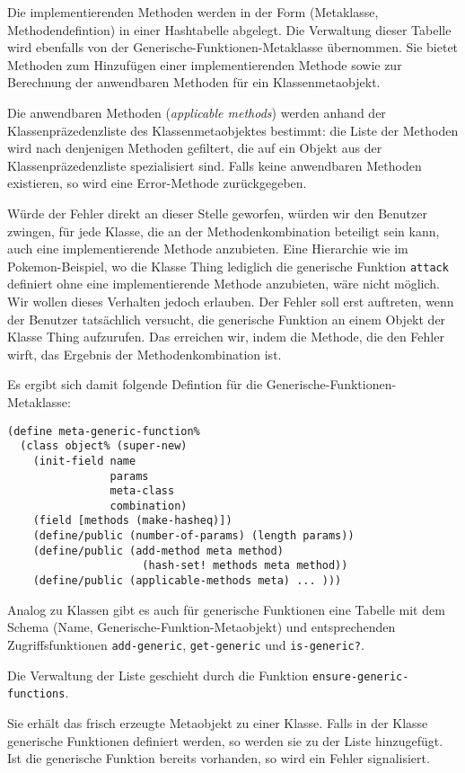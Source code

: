 Die implementierenden Methoden werden in der Form (Metaklasse, Methodendefintion) in einer Hashtabelle abgelegt. Die Verwaltung dieser Tabelle wird ebenfalls von der Generische-Funktionen-Metaklasse übernommen. Sie bietet Methoden zum Hinzufügen einer implementierenden Methode sowie zur Berechnung der anwendbaren Methoden für ein Klassenmetaobjekt.

Die anwendbaren Methoden (\emph{applicable methods}) werden anhand der Klassenpräzedenzliste des Klassenmetaobjektes bestimmt: die Liste der Methoden wird nach denjenigen Methoden gefiltert, die auf ein Objekt aus der Klassenpräzedenzliste spezialisiert sind. Falls keine anwendbaren Methoden existieren, so wird eine Error-Methode zurückgegeben. 

Würde der Fehler direkt an dieser Stelle geworfen, würden wir den Benutzer zwingen, für jede Klasse, die an der Methodenkombination beteiligt sein kann, auch eine implementierende Methode anzubieten. Eine Hierarchie wie im Pokemon-Beispiel, wo die Klasse Thing lediglich die generische Funktion \texttt{attack} definiert ohne eine implementierende Methode anzubieten, wäre nicht möglich. Wir wollen dieses Verhalten jedoch erlauben. Der Fehler soll erst auftreten, wenn der Benutzer tatsächlich versucht, die generische Funktion an einem Objekt der Klasse Thing aufzurufen. Das erreichen wir, indem die Methode, die den Fehler wirft, das Ergebnis der Methodenkombination ist.

Es ergibt sich damit folgende Defintion für die Generische-Funktionen-Metaklasse:

\begin{lstlisting}
(define meta-generic-function%
  (class object% (super-new)
    (init-field name
                params
                meta-class
                combination) 
    (field [methods (make-hasheq)]) 
    (define/public (number-of-params) (length params))
    (define/public (add-method meta method) 
                     (hash-set! methods meta method))
    (define/public (applicable-methods meta) ... )))
\end{lstlisting}

Analog zu Klassen gibt es auch für generische Funktionen eine Tabelle mit dem Schema (Name, Generische-Funktion-Metaobjekt) und entsprechenden Zugriffsfunktionen \texttt{add-generic}, \texttt{get-generic} und \texttt{is-generic?}.

Die Verwaltung der Liste geschieht durch die Funktion \texttt{ensure-generic-functions}. 

Sie erhält das frisch erzeugte Metaobjekt zu einer Klasse. Falls in der Klasse generische Funktionen definiert werden, so werden sie zu der Liste hinzugefügt. Ist die generische Funktion bereits vorhanden, so wird ein Fehler signalisiert.

